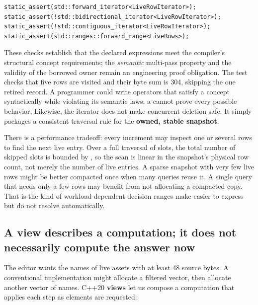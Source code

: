 \begin{verbatim}
static_assert(std::forward_iterator<LiveRowIterator>);
static_assert(!std::bidirectional_iterator<LiveRowIterator>);
static_assert(!std::contiguous_iterator<LiveRowIterator>);
static_assert(std::ranges::forward_range<LiveRows>);
\end{verbatim}

These checks establish that the declared expressions meet the compiler's structural concept requirements; the \emph{semantic} multi-pass property and the validity of the borrowed owner remain an engineering proof obligation. The test checks that five rows are visited and their byte sum is 304, skipping the one retired record. A programmer could write operators that satisfy a concept syntactically while violating its semantic laws; a  cannot prove every possible behavior. Likewise, the iterator does not make concurrent deletion safe. It simply packages a consistent traversal rule for the \textbf{owned, stable snapshot}.

There is a performance tradeoff: every increment may inspect one or several rows to find the next live entry. Over a full traversal of  slots, the total number of skipped slots is bounded by , so the scan is linear in the snapshot's physical row count, not merely the number of live entries. A sparse snapshot with very few live rows might be better compacted once when many queries reuse it. A single query that needs only a few rows may benefit from not allocating a compacted copy. That is the kind of workload-dependent decision ranges make easier to express but do not resolve automatically.

\subsection{A view describes a computation; it does not necessarily compute the answer now}\label{05-engine-i-ch006-a-view-describes-a-computation-it-does-not-necessarily-compute-the-answer-now}

\hypertarget{05-engine-i-ch006-a-view-describes-a-computation-it-does-not-necessarily-compute-the-answer-now}{}

The editor wants the names of live assets with at least 48 source bytes. A conventional implementation might allocate a filtered vector, then allocate another vector of names. C++20 \textbf{views} let us compose a computation that applies each step as elements are requested:

